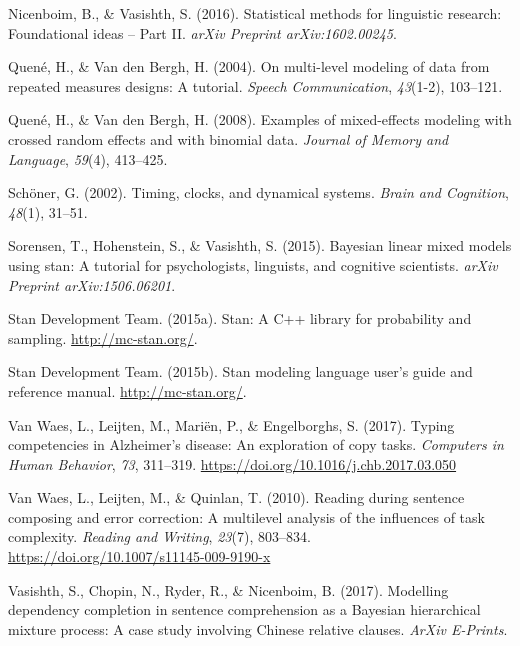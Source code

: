 \documentclass[,man,floatsintext]{apa6}
\begin{document}
\leavevmode\hypertarget{ref-nicenboim2016statistical}{}%
Nicenboim, B., \& Vasishth, S. (2016). Statistical methods for linguistic research: Foundational ideas -- Part II. \emph{arXiv Preprint arXiv:1602.00245}.

\leavevmode\hypertarget{ref-quene2004multi}{}%
Quené, H., \& Van den Bergh, H. (2004). On multi-level modeling of data from repeated measures designs: A tutorial. \emph{Speech Communication}, \emph{43}(1-2), 103--121.

\leavevmode\hypertarget{ref-quene2008examples}{}%
Quené, H., \& Van den Bergh, H. (2008). Examples of mixed-effects modeling with crossed random effects and with binomial data. \emph{Journal of Memory and Language}, \emph{59}(4), 413--425.

\leavevmode\hypertarget{ref-schoner2002timing}{}%
Schöner, G. (2002). Timing, clocks, and dynamical systems. \emph{Brain and Cognition}, \emph{48}(1), 31--51.

\leavevmode\hypertarget{ref-sorensen2015bayesian}{}%
Sorensen, T., Hohenstein, S., \& Vasishth, S. (2015). Bayesian linear mixed models using stan: A tutorial for psychologists, linguists, and cognitive scientists. \emph{arXiv Preprint arXiv:1506.06201}.

\leavevmode\hypertarget{ref-rstan}{}%
Stan Development Team. (2015a). Stan: A C++ library for probability and sampling. \url{http://mc-stan.org/}.

\leavevmode\hypertarget{ref-rstan2}{}%
Stan Development Team. (2015b). Stan modeling language user's guide and reference manual. \url{http://mc-stan.org/}.

\leavevmode\hypertarget{ref-van2017typing}{}%
Van Waes, L., Leijten, M., Mariën, P., \& Engelborghs, S. (2017). Typing competencies in Alzheimer's disease: An exploration of copy tasks. \emph{Computers in Human Behavior}, \emph{73}, 311--319. \url{https://doi.org/10.1016/j.chb.2017.03.050}

\leavevmode\hypertarget{ref-van2010reading}{}%
Van Waes, L., Leijten, M., \& Quinlan, T. (2010). Reading during sentence composing and error correction: A multilevel analysis of the influences of task complexity. \emph{Reading and Writing}, \emph{23}(7), 803--834. \url{https://doi.org/10.1007/s11145-009-9190-x}

\leavevmode\hypertarget{ref-vasishth2017}{}%
Vasishth, S., Chopin, N., Ryder, R., \& Nicenboim, B. (2017). Modelling dependency completion in sentence comprehension as a Bayesian hierarchical mixture process: A case study involving Chinese relative clauses. \emph{ArXiv E-Prints}.
\end{document}
